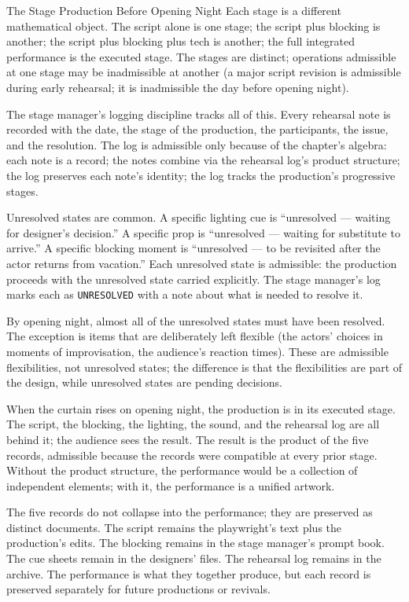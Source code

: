 \begin{coda}{The Stage Production Before Opening Night}
Each stage is a different mathematical object. The script alone
is one stage; the script plus blocking is another; the script
plus blocking plus tech is another; the full integrated
performance is the executed stage. The stages are distinct;
operations admissible at one stage may be inadmissible at another
(a major script revision is admissible during early rehearsal;
it is inadmissible the day before opening night).

The stage manager's logging discipline tracks all of this. Every
rehearsal note is recorded with the date, the stage of the
production, the participants, the issue, and the resolution. The
log is admissible only because of the chapter's algebra: each
note is a record; the notes combine via the rehearsal log's
product structure; the log preserves each note's identity; the
log tracks the production's progressive stages.

Unresolved states are common. A specific lighting cue is
``unresolved --- waiting for designer's decision.'' A specific
prop is ``unresolved --- waiting for substitute to arrive.'' A
specific blocking moment is ``unresolved --- to be revisited
after the actor returns from vacation.'' Each unresolved state
is admissible: the production proceeds with the unresolved
state carried explicitly. The stage manager's log marks each as
\texttt{UNRESOLVED} with a note about what is needed to resolve
it.

By opening night, almost all of the unresolved states must have
been resolved. The exception is items that are deliberately left
flexible (the actors' choices in moments of improvisation, the
audience's reaction times). These are admissible flexibilities,
not unresolved states; the difference is that the flexibilities
are part of the design, while unresolved states are pending
decisions.

When the curtain rises on opening night, the production is in
its executed stage. The script, the blocking, the lighting, the
sound, and the rehearsal log are all behind it; the audience
sees the result. The result is the product of the five records,
admissible because the records were compatible at every prior
stage. Without the product structure, the performance would be
a collection of independent elements; with it, the performance
is a unified artwork.

The five records do not collapse into the performance; they are
preserved as distinct documents. The script remains the
playwright's text plus the production's edits. The blocking
remains in the stage manager's prompt book. The cue sheets
remain in the designers' files. The rehearsal log remains in
the archive. The performance is what they together produce, but
each record is preserved separately for future productions or
revivals.


\end{coda}
